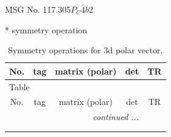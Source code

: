 \documentclass[fleqn,8pt]{jsarticle}
\begin{document}
\setcounter{MaxMatrixCols}{32}

\renewcommand{\tablename}{Table~}
\renewcommand{\figurename}{Figure~}
\begin{center}
\LARGE
MSG No. 117.305\quad$P_{C}\bar{4}b2$
\end{center}
* symmetry operation
\renewcommand{\arraystretch}{1.3}
\begin{longtable}{ccccc}
\caption{Symmetry operations for 3d polar vector.}
 \\
 \hline \hline
No. & tag & matrix (polar) & det & TR \\ \hline \endfirsthead

\multicolumn{4}{l}{\tablename\ \thetable{}} \\
 \hline \hline
No. & tag & matrix (polar) & det & TR \\ \hline \endhead

 \hline \hline
\multicolumn{4}{r}{\footnotesize\it continued ...} \\ \endfoot

 \hline \hline
\multicolumn{4}{r}{} \\ \endlastfoot


\end{longtable}
\end{document}
